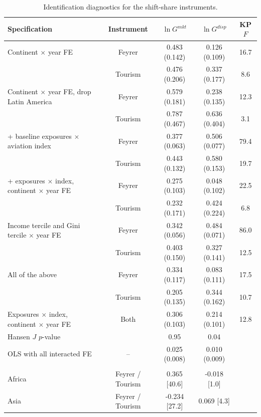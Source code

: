 \begin{table}[H]\centering\caption{Identification diagnostics for the shift-share instruments.}\label{tab:diag}
\begin{threeparttable}\small\begin{tabular}{lcccc}
\toprule
Specification & Instrument & $\ln G^{mkt}$ & $\ln G^{disp}$ & KP $F$ \\
\midrule
Continent $\times$ year FE & Feyrer & 0.483\sym{***} (0.142) & 0.126 (0.109) & 16.7 \\
 & Tourism & 0.476\sym{**} (0.206) & 0.337\sym{*} (0.177) & 8.6 \\
Continent $\times$ year FE, drop Latin America & Feyrer & 0.579\sym{***} (0.181) & 0.238\sym{*} (0.135) & 12.3 \\
 & Tourism & 0.787\sym{*} (0.467) & 0.636 (0.404) & 3.1 \\
+ baseline exposures $\times$ aviation index & Feyrer & 0.377\sym{***} (0.063) & 0.506\sym{***} (0.077) & 79.4 \\
 & Tourism & 0.443\sym{***} (0.132) & 0.580\sym{***} (0.153) & 19.7 \\
+ exposures $\times$ index, continent $\times$ year FE & Feyrer & 0.275\sym{***} (0.103) & 0.048 (0.102) & 22.5 \\
 & Tourism & 0.232 (0.171) & 0.424\sym{*} (0.224) & 6.8 \\
Income tercile and Gini tercile $\times$ year FE & Feyrer & 0.342\sym{***} (0.056) & 0.484\sym{***} (0.071) & 86.0 \\
 & Tourism & 0.403\sym{***} (0.150) & 0.327\sym{**} (0.141) & 12.5 \\
All of the above & Feyrer & 0.334\sym{***} (0.117) & 0.083 (0.111) & 17.5 \\
 & Tourism & 0.205 (0.135) & 0.344\sym{**} (0.162) & 10.7 \\
Exposures $\times$ index, continent $\times$ year FE & Both & 0.306\sym{***} (0.103) & 0.214\sym{**} (0.101) & 12.8 \\
\quad Hansen $J$ $p$-value & & 0.95 & 0.04 & \\
OLS with all interacted FE & -- & 0.025\sym{***} (0.008) & 0.010 (0.009) & \\
\addlinespace\multicolumn{5}{l}{\emph{First stage by continent (coefficient on instrument, KP $F$)}}\\
Africa & Feyrer / Tourism & 0.365\sym{***} [40.6] & -0.018 [1.0] & \\
Asia & Feyrer / Tourism & -0.234\sym{***} [27.2] & 0.069\sym{**} [4.3] & \\

\end{tabular}
\end{threeparttable}
\end{table}
